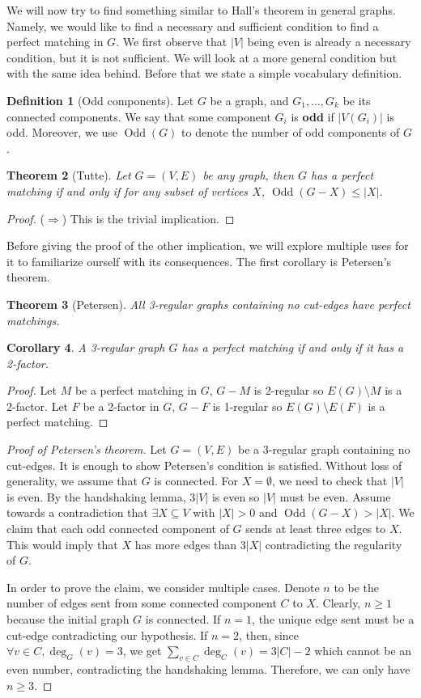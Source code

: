 \documentclass{tufte-handout}
\newtheorem{thm}{Theorem}
\newtheorem{cor}[thm]{Corollary}
\theoremstyle{definition}
\newtheorem{defn}[thm]{Definition}
\theoremstyle{remark}
\DeclareMathOperator{\odd}{Odd}
\begin{document}
We will now try to find something similar to Hall's theorem in general graphs. Namely, we would like to find a necessary and sufficient condition to find a perfect matching in $G$. We first observe that $|V|$ being even is already a necessary condition, but it is not sufficient. We will look at a more general condition but with the same idea behind. Before that we state a simple vocabulary definition.

\begin{defn}[Odd components]
	Let $G$ be a graph, and $G_1, \dots, G_k$ be its connected components. We say that some component $G_i$ is \textbf{odd} if $|V(G_i)|$ is odd. Moreover, we use $\odd(G)$ to denote the number of odd components of $G$.
\end{defn}
\begin{thm}[Tutte]
	Let $G = (V,E)$ be any graph, then $G$ has a perfect matching if and only if for any subset of vertices $X$, $\odd(G-X) \leq |X|$.
\end{thm}
\begin{proof}
	($\Rightarrow$) This is the trivial implication.
\end{proof}
Before giving the proof of the other implication, we will explore multiple uses for it to familiarize ourself with its consequences. The first corollary is Petersen's theorem.
\begin{thm}[Petersen]
	All 3-regular graphs containing no cut-edges have perfect matchings.
\end{thm}
\begin{cor}
	A 3-regular graph $G$ has a perfect matching if and only if it has a 2-factor.
\end{cor}
\begin{proof}
	Let $M$ be a perfect matching in $G$, $G-M$ is 2-regular so $E(G) \setminus M$ is a 2-factor. Let $F$ be a 2-factor in $G$, $G-F$ is 1-regular so $E(G) \setminus E(F)$ is a perfect matching.
\end{proof}
\begin{proof}[Proof of Petersen's theorem]
	Let $G= (V,E)$ be a 3-regular graph containing no cut-edges. It is enough to show Petersen's condition is satisfied. Without loss of generality, we assume that $G$ is connected. For $X = \emptyset$, we need to check that $|V|$ is even. By the handshaking lemma, $3|V|$ is even so $|V|$ must be even. Assume towards a contradiction that $\exists X \subseteq V$ with $|X| > 0$ and $\odd(G-X) > |X|$. We claim that each odd connected component of $G$ sends at least three edges to $X$. This would imply that $X$ has more edges than $3|X|$ contradicting the regularity of $G$.
	
	In order to prove the claim, we consider multiple cases. Denote $n$ to be the number of edges sent from some connected component $C$ to $X$. Clearly, $n \geq 1$ because the initial graph $G$ is connected. If $n=1$, the unique edge sent must be a cut-edge contradicting our hypothesis. If $n=2$, then, since $\forall v \in C, \deg_G(v) = 3$, we get $\sum_{v \in C} \deg_C(v) = 3|C| -2$ which cannot be an even number, contradicting the handshaking lemma. Therefore, we can only have $n\geq 3$. 
\end{proof}
\end{document}
